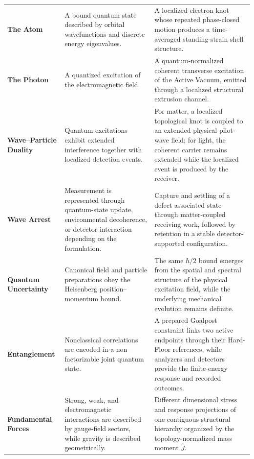 \begin{longtable}{@{} p{3.0cm} p{5.5cm} p{6.5cm} @{}}
\textbf{The Atom}
&
A bound quantum state described by orbital wavefunctions and discrete energy eigenvalues.
&
A localized electron knot whose repeated phase-closed motion produces a time-averaged standing-strain shell structure.
\\

\textbf{The Photon}
&
A quantized excitation of the electromagnetic field.
&
A quantum-normalized coherent transverse excitation of the Active Vacuum, emitted through a localized structural extrusion channel.
\\

\textbf{Wave--Particle Duality}
&
Quantum excitations exhibit extended interference together with localized detection events.
&
For matter, a localized topological knot is coupled to an extended physical pilot-wave field; for light, the coherent carrier remains extended while the localized event is produced by the receiver.
\\

\textbf{Wave Arrest}
&
Measurement is represented through quantum-state update, environmental decoherence, or detector interaction depending on the formulation.
&
Capture and settling of a defect-associated state through matter-coupled receiving work, followed by retention in a stable detector-supported configuration.
\\

\textbf{Quantum Uncertainty}
&
Canonical field and particle preparations obey the Heisenberg position--momentum bound.
&
The same $\hbar/2$ bound emerges from the spatial and spectral structure of the physical excitation field, while the underlying mechanical evolution remains definite.
\\

\textbf{Entanglement}
&
Nonclassical correlations are encoded in a non-factorizable joint quantum state.
&
A prepared Goalpost constraint links two active endpoints through their Hard-Floor references, while analyzers and detectors provide the finite-energy response and recorded outcomes.
\\

\textbf{Fundamental Forces}
&
Strong, weak, and electromagnetic interactions are described by gauge-field sectors, while gravity is described geometrically.
&
Different dimensional stress and response projections of one contiguous structural hierarchy organized by the topology-normalized mass moment $\hat J$.
\\

\end{longtable}
\egroup



